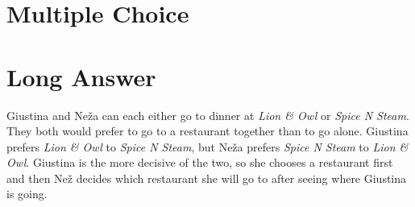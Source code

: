 \documentclass[addpoints]{exam}
\begin{document}
\begin{questions}


\question[20] 

\section*{Multiple Choice}
\noindent{}


\section*{Long Answer}


\question 

Giustina and Ne\v{z}a can each either go to dinner at 
  \textit{Lion \& Owl} or \textit{Spice N Steam}.
They both would prefer to go to a restaurant together than to go alone.
Giustina prefers \textit{Lion \& Owl} to \textit{Spice N Steam}, 
  but Ne\v{z}a prefers \textit{Spice N Steam} to \textit{Lion \& Owl}.
Giustina is the more decisive of the two, 
so she chooses a restaurant first
and then Ne\v{z} decides which restaurant she will go to 
after seeing where Giustina is going.

\end{questions}
\end{document}

